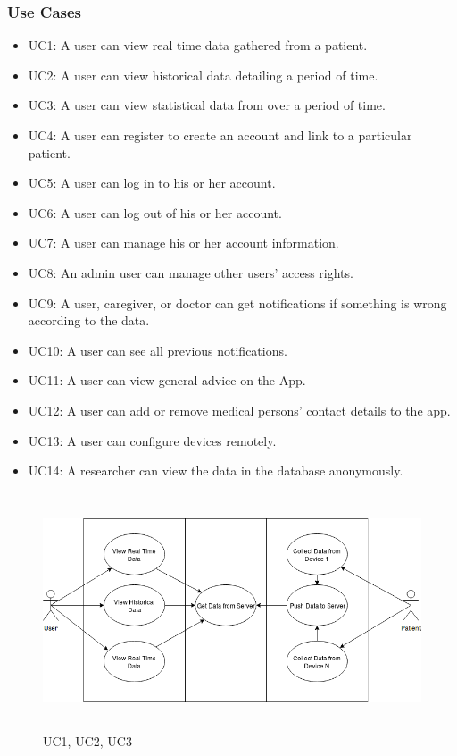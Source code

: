 \pagebreak
\subsubsection{Use Cases}

\begin{itemize}
	\item UC1: A user can view real time data gathered from a patient.

	\item UC2: A user can view historical data detailing a period of time.
	
	\item UC3: A user can view statistical data from over a period of time.

	
	\item UC4: A user can register to create an account and link to a particular patient.
	
	\item UC5: A user can log in to his or her account.
	
	\item UC6: A user can log out of his or her account.
	
	\item UC7: A user can manage his or her account information.		

	\item UC8: An admin user can manage other users' access rights.


	\item UC9: A user, caregiver, or doctor can get notifications if something is wrong according to the data.

	
	\item UC10: A user can see all previous notifications.

	\item UC11: A user can view general advice on the App.
	
	\item UC12: A user can add or remove medical persons' contact details to the app.

	\item UC13: A user can configure devices remotely.

		
	\item UC14: A researcher can view the data in the database anonymously.	
	

\end{itemize}
\pagebreak
\begin{figure}[!htb]
	\includegraphics[width=15cm, height=7cm]{Diagrams/UseCase123.png}
	\caption{UC1, UC2, UC3}
\end{figure}

